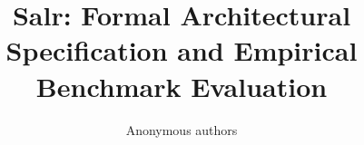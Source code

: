 \title{\textbf{Salr: Formal Architectural Specification and Empirical Benchmark Evaluation}}

\author{Anonymous authors}
